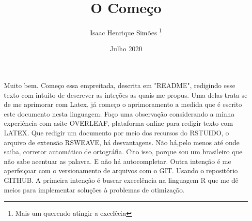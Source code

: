 \documentclass[12pt,twoside]{article}
\title{O Começo}
\author{Isaac Henrique Simões \thanks{Mais um querendo atingir a excelêcia}}
\date{Julho 2020}
\begin{document}


\begin{titlepage}
  \maketitle
\end{titlepage}

Muito bem. Começo essa empreitada, descrita em "README", redigindo esse texto com intuito de descrever as inteções as quais me propus. Uma delas trata se de me aprimorar com Latex, já começo o aprimoramento a medida que é escrito este documento nesta linguagem. Faço uma observação considerando a minha experiência com asite OVERLEAF, plataforma online para redigir texto com LATEX. Que redigir um documento por meio dos recursos do RSTUIDO, o arquivo de extensão RSWEAVE, há  desvantagens. Não há,pelo menos até onde saiba, corretor automático de ortográfia. Cito isso, porque sou um brasileiro que não sabe acentuar as palavra. E não há autocompletar.
Outra intenção é me aperfeiçoar com o versionamento de arquivos com o GIT. Usando o repositório GITHUB. 
A primeira intenção é buscar execelência na linguagem R que me dê meios para implementar soluções à problemas de otimização.
\end{document}
